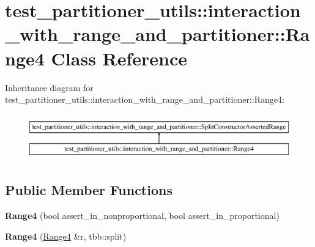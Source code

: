 \hypertarget{classtest__partitioner__utils_1_1interaction__with__range__and__partitioner_1_1Range4}{}\section{test\+\_\+partitioner\+\_\+utils\+:\+:interaction\+\_\+with\+\_\+range\+\_\+and\+\_\+partitioner\+:\+:Range4 Class Reference}
\label{classtest__partitioner__utils_1_1interaction__with__range__and__partitioner_1_1Range4}
Inheritance diagram for test\+\_\+partitioner\+\_\+utils\+:\+:interaction\+\_\+with\+\_\+range\+\_\+and\+\_\+partitioner\+:\+:Range4\+:\begin{figure}[H]
\begin{center}
\leavevmode
\includegraphics[height=2.000000cm]{classtest__partitioner__utils_1_1interaction__with__range__and__partitioner_1_1Range4}
\end{center}
\end{figure}
\subsection*{Public Member Functions}
\begin{DoxyCompactItemize}
\item 
\hypertarget{classtest__partitioner__utils_1_1interaction__with__range__and__partitioner_1_1Range4_a3a84e8271cef6973e747d1ee515aceb7}{}{\bfseries Range4} (bool assert\+\_\+in\+\_\+nonproportional, bool assert\+\_\+in\+\_\+proportional)\label{classtest__partitioner__utils_1_1interaction__with__range__and__partitioner_1_1Range4_a3a84e8271cef6973e747d1ee515aceb7}

\item 
\hypertarget{classtest__partitioner__utils_1_1interaction__with__range__and__partitioner_1_1Range4_aa507cce8a3fc4c69d5777a402587e07e}{}{\bfseries Range4} (\hyperlink{classtest__partitioner__utils_1_1interaction__with__range__and__partitioner_1_1Range4}{Range4} \&r, tbb\+::split)\label{classtest__partitioner__utils_1_1interaction__with__range__and__partitioner_1_1Range4_aa507cce8a3fc4c69d5777a402587e07e}

\end{DoxyCompactItemize}
